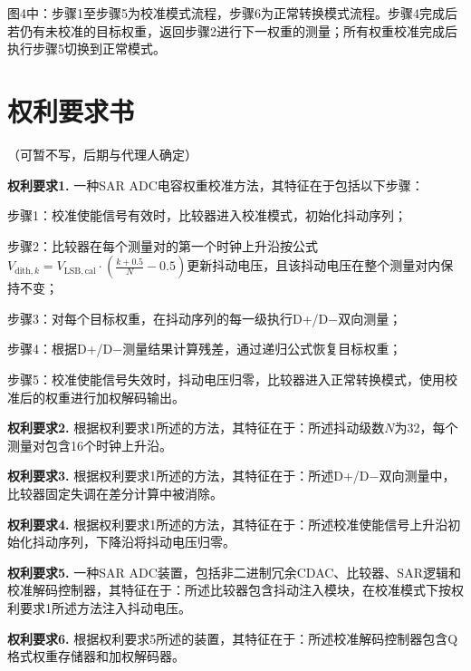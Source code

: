 \documentclass[UTF8,a4paper,11pt]{ctexart}
\begin{document}
图4中：步骤1至步骤5为校准模式流程，步骤6为正常转换模式流程。步骤4完成后若仍有未校准的目标权重，返回步骤2进行下一权重的测量；所有权重校准完成后执行步骤5切换到正常模式。

\section{权利要求书}

（可暂不写，后期与代理人确定）

\textbf{权利要求1.} 一种SAR ADC电容权重校准方法，其特征在于包括以下步骤：

步骤1：校准使能信号有效时，比较器进入校准模式，初始化抖动序列；

步骤2：比较器在每个测量对的第一个时钟上升沿按公式$V_{\mathrm{dith},k} = V_{\mathrm{LSB,cal}} \cdot \left(\frac{k+0.5}{N} - 0.5\right)$更新抖动电压，且该抖动电压在整个测量对内保持不变；

步骤3：对每个目标权重，在抖动序列的每一级执行D+/D$-$双向测量；

步骤4：根据D+/D$-$测量结果计算残差，通过递归公式恢复目标权重；

步骤5：校准使能信号失效时，抖动电压归零，比较器进入正常转换模式，使用校准后的权重进行加权解码输出。

\textbf{权利要求2.} 根据权利要求1所述的方法，其特征在于：所述抖动级数$N$为32，每个测量对包含16个时钟上升沿。

\textbf{权利要求3.} 根据权利要求1所述的方法，其特征在于：所述D+/D$-$双向测量中，比较器固定失调在差分计算中被消除。

\textbf{权利要求4.} 根据权利要求1所述的方法，其特征在于：所述校准使能信号上升沿初始化抖动序列，下降沿将抖动电压归零。

\textbf{权利要求5.} 一种SAR ADC装置，包括非二进制冗余CDAC、比较器、SAR逻辑和校准解码控制器，其特征在于：所述比较器包含抖动注入模块，在校准模式下按权利要求1所述方法注入抖动电压。

\textbf{权利要求6.} 根据权利要求5所述的装置，其特征在于：所述校准解码控制器包含Q格式权重存储器和加权解码器。
\end{document}
